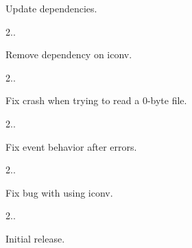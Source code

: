 \begin{DoxyItemize}
\begin{DoxyItemize}
\item Update dependencies.
\end{DoxyItemize}
\item 2..
\begin{DoxyItemize}
\item Remove dependency on {\ttfamily iconv}.
\end{DoxyItemize}
\item 2..
\begin{DoxyItemize}
\item Fix crash when trying to read a 0-\/byte file.
\end{DoxyItemize}
\item 2..
\begin{DoxyItemize}
\item Fix event behavior after errors.
\end{DoxyItemize}
\item 2..
\begin{DoxyItemize}
\item Fix bug with using {\ttfamily iconv}.
\end{DoxyItemize}
\item 2..
\begin{DoxyItemize}
\item Initial release. 
\end{DoxyItemize}
\end{DoxyItemize}